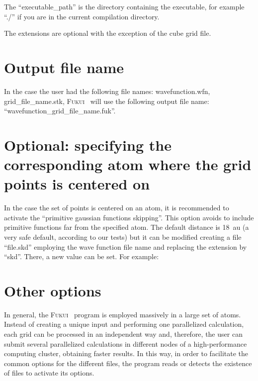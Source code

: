 \documentclass[a4paper,11pt,openany]{memoir}
\newcommand\programa{\textsc{Fukui}}
\begin{document}
The ``executable\_path'' is the directory containing the executable, for example ``./'' if you are in the current compilation directory.

The extensions are optional with the exception of the cube grid file.

\section{Output file name}
In the case the user had the following file names: wavefunction.wfn, grid\_file\_name.stk, \programa~ will use the following output file name: ``wavefunction\_grid\_file\_name.fuk''.

\section{Optional: specifying the corresponding atom where the grid points is centered on}\label{sec:gauss.skip}
In the case the set of points is centered on an atom, it is recommended to activate the ``primitive gaussian functions skipping''. This option avoids to include primitive functions far from the specified atom. The default distance is \SI{18}{au} (a very safe default, according to our tests) but it can be modified creating a file ``file.skd'' employing the wave function file name and replacing the extension by ``skd''. There, a new value can be set. For example:

\section{Other options}
In general, the \programa~ program is employed massively in a large set of atoms. Instead of creating a unique input and performing one parallelized calculation, each grid can be processed in an independent way and, therefore, the user can submit several parallelized calculations in different nodes of a high-performance computing cluster, obtaining faster results. In this way, in order to facilitate the common options for the different files, the program reads or detects the existence of files to activate its options.
\end{document}
